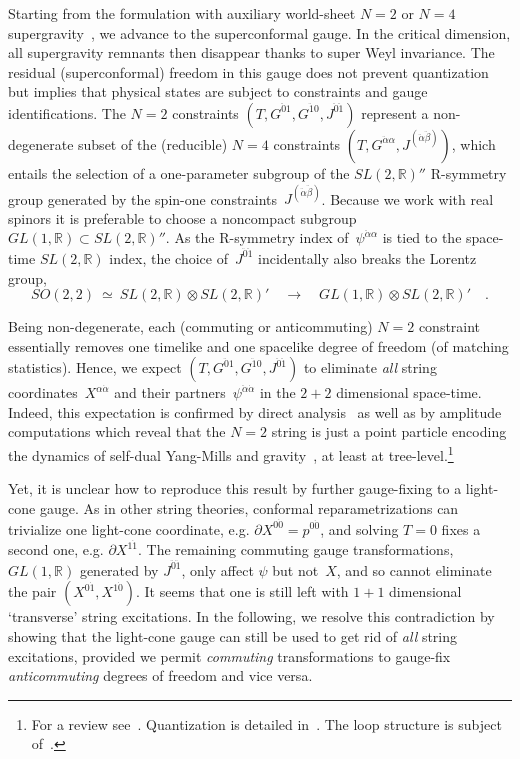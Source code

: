 \documentclass[a4paper,11pt]{article}
\def\a{\alpha}
\def\j{\psi}
\newcommand{\R}{\mathbb R}
\def\N2{$N{=}2$}
\def\NN4{$N{=}4$}
\def\pa{\mbox{$\partial$}}
\def\ad{{\dot{\alpha}}}
\def\zd{{\dot{0}}}
\def\od{{\dot{1}}}
\def\add{{\ddot{\alpha}}}
\def\bdd{{\ddot{\beta}}}
\def\zdd{{\ddot{0}}}
\def\odd{{\ddot{1}}}
\begin{document}
Starting from the formulation with auxiliary world-sheet \N2 or
\NN4 supergravity~\cite{brink,pernici}, we advance to the superconformal gauge.
In the critical dimension, all supergravity remnants then disappear thanks to
super Weyl invariance. The residual (superconformal) freedom in this gauge 
does not prevent quantization but implies that physical states are
subject to constraints and gauge identifications. 
The \N2 constraints $(T,G^{\zdd 1},G^{\odd 0},J^{\zdd\odd})$
represent a non-degenerate subset of the (reducible) \NN4 constraints
$(T,G^{\add\a},J^{(\add\bdd)})$, 
which entails the selection of a one-parameter subgroup of the $SL(2,\R)''$ 
R-symmetry group generated by the spin-one constraints~$J^{(\add\bdd)}$. 
Because we work with real spinors it is preferable to choose a noncompact
subgroup $GL(1,\R)\subset SL(2,\R)''$.
As the R-symmetry index of~$\j^{\add\a}$ is tied to the space-time $SL(2,\R)$ 
index, the choice of~$J^{\zdd\odd}$ incidentally also breaks the Lorentz group,
\begin{equation}
SO(2,2)\ \simeq\ SL(2,\R)\otimes SL(2,\R)'\quad\longrightarrow\quad
GL(1,\R)\otimes SL(2,\R)' \quad.
\end{equation}

Being non-degenerate,
each (commuting or anticommuting) \N2 constraint essentially removes
one timelike and one spacelike degree of freedom (of matching statistics).
Hence, we expect $(T,G^{\zdd 1},G^{\odd 0},J^{\zdd\odd})$ to eliminate
{\it all\/} string coordinates~$X^{\a\ad}$ and their partners~$\j^{\add\ad}$
in the $2{+}2$ dimensional space-time. 
Indeed, this expectation is confirmed by direct analysis~\cite{bien} as well as
by amplitude computations which reveal that the \N2 string is just a point
particle encoding the dynamics of self-dual Yang-Mills and gravity~\cite{OV},
at least at tree-level.\footnote{
For a review see~\cite{marcus,dubna}. 
Quantization is detailed in~\cite{bischoff}.
The loop structure is subject of~\cite{CLN,CS}.}

Yet, it is unclear how to reproduce this result by further gauge-fixing
to a light-cone gauge.
As in other string theories, conformal reparametrizations can trivialize
one light-cone coordinate, e.g. $\pa X^{0\zd}=p^{0\zd}$, and solving
$T{=}0$ fixes a second one, e.g. $\pa X^{1\od}$. The remaining commuting 
gauge transformations, $GL(1,\R)$ generated by $J^{\zdd\odd}$, only affect 
$\j$ but not~$X$, and so cannot eliminate the pair $(X^{0\od},X^{1\zd})$. 
It seems that one is still left with 
$1{+}1$ dimensional `transverse' string excitations.
In the following, 
we resolve this contradiction by showing that the light-cone
gauge can still be used to get rid of {\it all\/} string excitations,
provided we permit {\it commuting\/} transformations to gauge-fix
{\it anticommuting\/} degrees of freedom and vice versa.
\\
\end{document}
